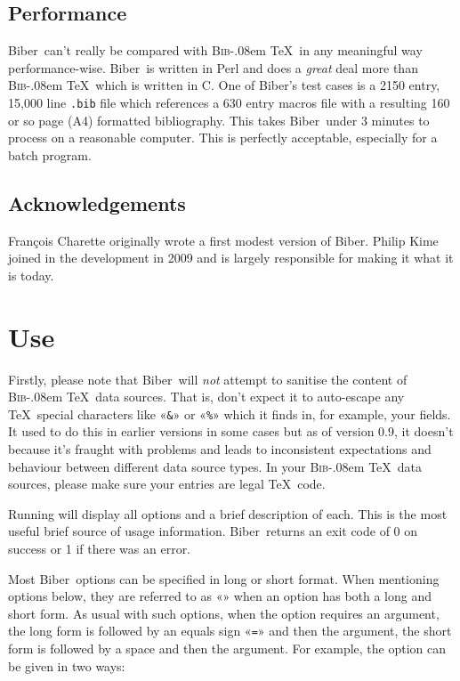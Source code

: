 \documentclass{ltxdockit}
\def\BibTeX{\textsc{Bib}\kern-.08em \TeX}
\newcommand*{\biber}{Biber\xspace}
\begin{document}
\subsection{Performance}

\biber\ can't really be compared with \BibTeX\ in any meaningful
way performance-wise. \biber\ is written in Perl and does a
\emph{great} deal more than \BibTeX\ which is written in C. One of
\biber's test cases is a 2150 entry, 15,000 line \verb+.bib+ file
which references a 630 entry macros file with a resulting 160 or so page (A4)
formatted bibliography. This takes \biber\ under 3 minutes to process on
a reasonable computer. This is perfectly acceptable, especially for a
batch program.

\subsection{Acknowledgements}

François Charette originally wrote a first modest version of \biber. Philip Kime joined in
the development in 2009 and is largely responsible for making it what it is today. 

\section{Use}

Firstly, please note that \biber\ will \emph{not} attempt to sanitise
the content of \BibTeX\ data sources. That is, don't expect it to
auto-escape any \TeX\ special characters like «\verb+&+» or «\verb+%+» which
it finds in, for example, your  fields. It used to do this in
earlier versions in some cases but as of version 0.9, it doesn't because
it's fraught with problems and leads to inconsistent expectations and
behaviour between different data source types. In your \BibTeX\ data
sources, please make sure your entries are legal \TeX\ code.

Running  will display all options and a brief
description of each. This is the most useful brief source of usage
information. \biber\ returns an exit code of 0 on success or 1 if
there was an error.

Most \biber\ options can be specified in long or short format. When
mentioning options below, they are referred to as
«» when an option has both a long and short
form. As usual with such options, when the option requires an argument, the
long form is followed by an equals sign «\verb+=+» and then the argument,
the short form is followed by a space and then the argument. For example,
the  option can be given in two ways:
\end{document}
